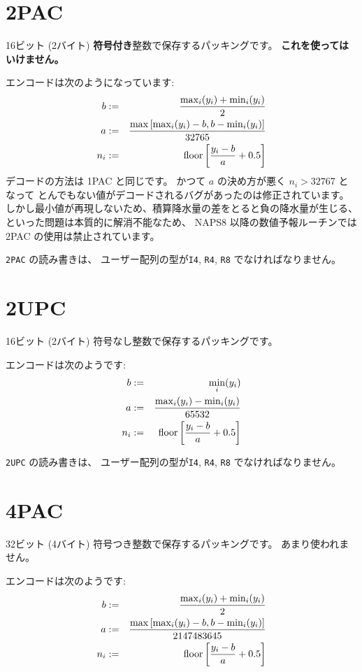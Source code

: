 \section{2PAC}

16ビット (2バイト) {\bf 符号付き}整数で保存するパッキングです。
{\bf これを使ってはいけません。}

エンコードは次のようになっています:
\begin{eqnarray}
b &:=& \frac{\max_i(y_i) + \min_i(y_i)}{2} \\
a &:=& \frac{\max\left[\max_i(y_i) - b, b - \min_i(y_i)\right]}{32765} \\
n_i &:=& {\rm floor}\left[\frac{y_i - b}{a} + 0.5\right]
\end{eqnarray}
デコードの方法は 1PAC と同じです。
かつて $a$ の決め方が悪く $n_i > 32767$ となって
とんでもない値がデコードされるバグがあったのは修正されています。
しかし最小値が再現しないため、積算降水量の差をとると負の降水量が生じる、
といった問題は本質的に解消不能なため、
NAPS8 以降の数値予報ルーチンでは 2PAC の使用は禁止されています。

{\tt 2PAC} の読み書きは、
ユーザー配列の型が{\tt I4}, {\tt R4}, {\tt R8} でなければなりません。

\section{2UPC}
16ビット (2バイト) 符号なし整数で保存するパッキングです。

エンコードは次のようです:
\begin{eqnarray}
b &:=& \min_i(y_i) \\
a &:=& \frac{\max_i(y_i) - \min_i(y_i)}{65532} \\
n_i &:=& {\rm floor}\left[\frac{y_i - b}{a} + 0.5\right]
\end{eqnarray}

{\tt 2UPC} の読み書きは、
ユーザー配列の型が{\tt I4}, {\tt R4}, {\tt R8} でなければなりません。

\section{4PAC}

32ビット (4バイト) 符号つき整数で保存するパッキングです。
あまり使われません。

エンコードは次のようです:
\begin{eqnarray}
b &:=& \frac{\max_i(y_i) + \min_i(y_i)}{2} \\
a &:=& \frac{\max\left[\max_i(y_i) - b, b - \min_i(y_i)\right]}{2147483645} \\
n_i &:=& {\rm floor}\left[\frac{y_i - b}{a} + 0.5\right] \label{eq:2upc:n}
\end{eqnarray}

